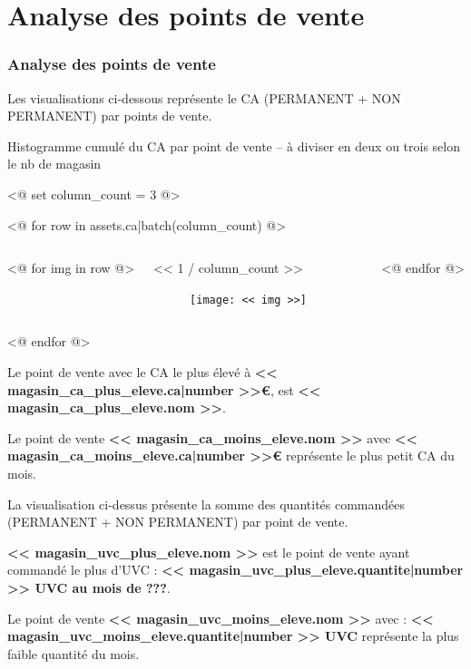 \documentclass{beamer}
\begin{document}
    \section{Analyse des points de vente}

    \begin{frame}
        \tiny
        \frametitle{Analyse des points de vente}

        Les visualisations ci-dessous représente le CA (PERMANENT + NON PERMANENT) par points de vente.\par

        {Histogramme cumulé du CA par point de vente – à diviser en deux ou trois selon le nb de magasin}

        <@ set column_count = 3  @>

        <@ for row in assets.ca|batch(column_count) @>
            \begin{columns}
                <@ for img in row @>
                    \begin{column}{<< 1 / column_count >>\textwidth}
                        \begin{center}
                            \begin{figure}[h]
                                \texttt{[image: << img >>]}
                                \centering
                            \end{figure}
                        \end{center}
                    \end{column}
                <@ endfor @>
            \end{columns}
        <@ endfor @>


        Le point de vente avec le CA le plus élevé à \textbf{<< magasin_ca_plus_eleve.ca|number >>€}, est \textbf{<< magasin_ca_plus_eleve.nom >>}.\par
        Le point de vente \textbf{<< magasin_ca_moins_eleve.nom >>} avec \textbf{<< magasin_ca_moins_eleve.ca|number >>€} représente le plus petit CA du mois.\par
        La visualisation ci-dessus présente la somme des quantités commandées (PERMANENT + NON PERMANENT) par point de vente.\par
        \textbf{<< magasin_uvc_plus_eleve.nom >>} est le point de vente ayant commandé le plus d’UVC : \textbf{<< magasin_uvc_plus_eleve.quantite|number >> UVC au mois de ???}.\par
        Le point de vente \textbf{<< magasin_uvc_moins_eleve.nom >>} avec : \textbf{<< magasin_uvc_moins_eleve.quantite|number >> UVC} représente la plus faible quantité du mois.\par
    \end{frame}
\end{document}
